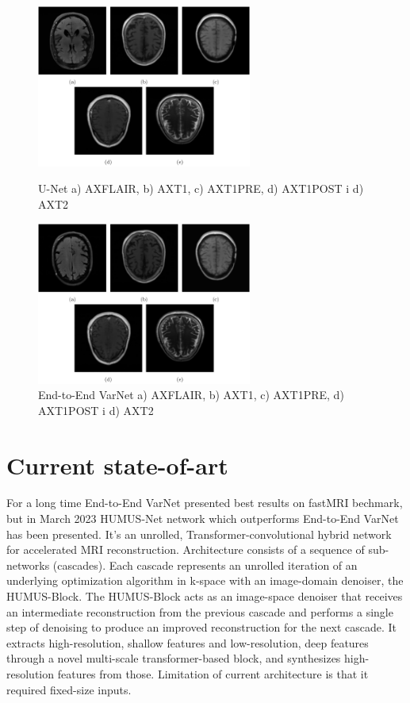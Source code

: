 \documentclass[10pt,a4paper]{article}
\begin{document}
\begin{figure}[H]
\begin{minipage}{.45\textwidth}
  \centering
  \includegraphics[width=200pt]{./images/unet-images.png}
  \caption{U-Net a) AXFLAIR, b) AXT1, c) AXT1PRE, d) AXT1POST i d) AXT2}
\end{minipage}%
\hspace{20pt} %
\begin{minipage}{.45\textwidth}
  \centering
  \includegraphics[width=200pt]{./images/varnet-images.png}
  \caption{End-to-End VarNet a) AXFLAIR, b) AXT1, c) AXT1PRE, d) AXT1POST i d) AXT2}
\end{minipage}
\end{figure}

\newpage

\section{Current state-of-art}

For a long time End-to-End VarNet presented best results on fastMRI bechmark, but in March 2023 HUMUS-Net network which outperforms End-to-End VarNet has been presented. It's an unrolled, Transformer-convolutional hybrid network for accelerated MRI reconstruction. Architecture consists of a sequence of sub-networks (cascades). Each cascade represents an unrolled iteration of an underlying optimization algorithm in k-space with an image-domain denoiser, the HUMUS-Block. The HUMUS-Block acts as an image-space denoiser that receives an intermediate reconstruction from the previous cascade and performs a single step of denoising to produce an improved reconstruction for the next cascade. It extracts high-resolution, shallow features and low-resolution, deep features through a novel multi-scale transformer-based block, and synthesizes high-resolution features from those. Limitation of current architecture is that it required fixed-size inputs. \cite{fabian2023humusnet}
\end{document}
